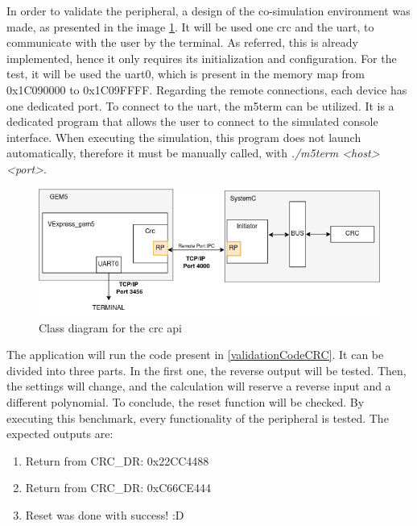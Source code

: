In order to validate the peripheral, a design of the co-simulation environment was made, as presented in the image 
\ref{fig_CoSimDesign_Validation}. It will be used one \gls*{crc} and the \gls*{uart}, to communicate with the user by the terminal.
As referred, this is already implemented, hence it only requires its initialization and configuration. For the test, it will be used the 
\gls*{uart}0, which is present in the memory map from 0x1C090000 to 0x1C09FFFF.
Regarding the remote connections, each device has one dedicated port. To connect to the \gls*{uart}, the m5term can be utilized. It is
a dedicated program that allows the user to connect to the simulated console interface. When executing the simulation, this program does not
launch automatically, therefore it must be manually called, with \textit{./m5term <host> <port>}.

\begin{figure}[H]
	\centering
 	\includegraphics[width=0.8\linewidth]{Images/CoSimDesign_Validation.png} 
 	\caption{Class diagram for the \gls{crc} \gls{api}}
	\label{fig_CoSimDesign_Validation}
\end{figure}

The application will run the code present in \ref{validationCodeCRC}. It can be divided into three parts. In the first one, the reverse 
output will be tested. Then, the settings will change, and the calculation will reserve a reverse input and a different polynomial. To
conclude, the reset function will be checked. By executing this benchmark, every functionality of the peripheral is tested. The expected
outputs are:

\begin{enumerate}
	\item Return from CRC\_DR: 0x22CC4488
	\item Return from CRC\_DR: 0xC66CE444
	\item Reset was done with success! :D
\end{enumerate}

